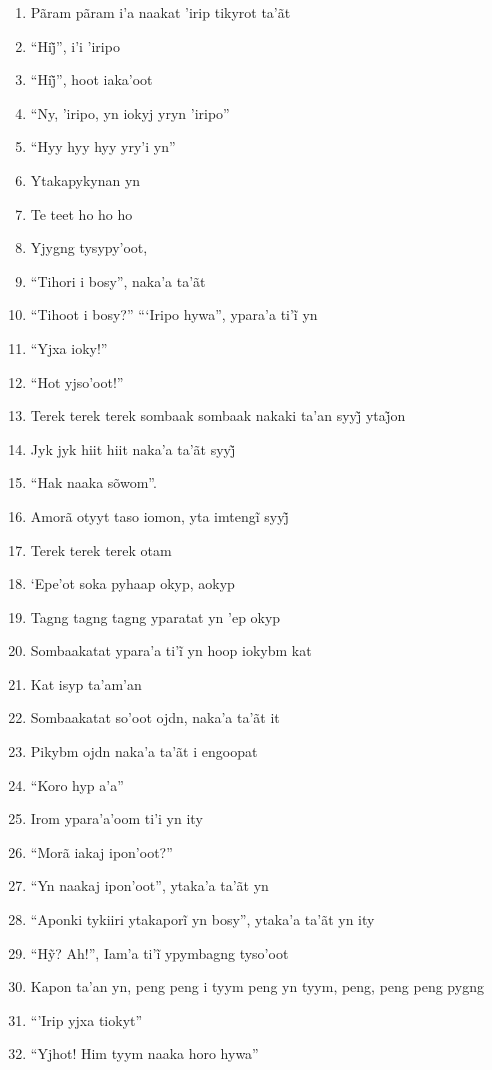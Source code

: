 \begin{enumerate}
 \item Pãram pãram i'a naakat 'irip tikyrot ta'ãt
 \item ``Hij̃'', i’i ’iripo
 \item ``Hij̃'', hoot iaka’oot
 \item ``Ny, 'iripo, yn iokyj yryn 'iripo''
 \item ``Hyy hyy hyy yry'i yn''
 \item Ytakapykynan yn
 \item Te teet ho ho ho
 \item Yjygng tysypy'oot,
 \item ``Tihori i bosy'', naka'a ta'ãt
 \item ``Tihoot i bosy?'' ``‘Iripo hywa'', ypara’a ti’ĩ yn
 \item ``Yjxa ioky!''
 \item ``Hot yjso'oot!''
 \begin{center}\end{center}
 \item Terek terek terek sombaak sombaak nakaki ta’an syyj̃ ytaj̃on
 \item Jyk jyk hiit hiit naka’a ta’ãt syyj̃
 \item ``Hak naaka sõwom''.
 \item Amorã otyyt taso iomon, yta imtengĩ syyj̃
 \item Terek terek terek otam
 \item `Epe'ot soka pyhaap okyp, aokyp
 \item Tagng tagng tagng yparatat yn 'ep okyp
 \item Sombaakatat ypara’a ti’ĩ yn hoop iokybm kat
 \item Kat isyp ta'am'an
 \item Sombaakatat so'oot ojdn, naka'a ta'ãt it
 \item Pikybm ojdn naka'a ta'ãt i engoopat
 \item ``Koro hyp a'a''
 \item Irom ypara'a'oom ti'i yn ity
 \item ``Morã iakaj ipon'oot?''
 \item ``Yn naakaj ipon'oot'', ytaka'a ta'ãt yn
 \item ``Aponki tykiiri ytakaporĩ yn bosy'', ytaka’a ta’ãt yn ity
 \item ``Hỹ? Ah!'', Iam’a ti’ĩ ypymbagng tyso’oot
 \item Kapon ta'an yn, peng peng i tyym peng yn tyym, peng, peng peng pygng
 \item ``'Irip yjxa tiokyt''
 \item ``Yjhot! Him tyym naaka horo hywa''

\end{enumerate}
